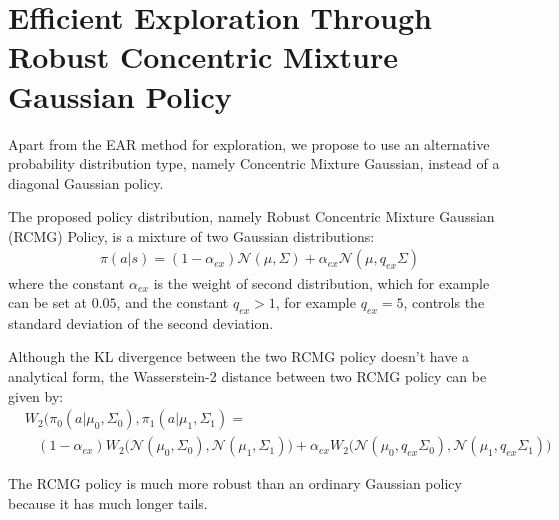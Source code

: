 \section{Efficient Exploration Through Robust Concentric Mixture Gaussian Policy}
Apart from the EAR method for exploration, we propose to use an alternative probability distribution type, namely Concentric Mixture Gaussian, instead of a diagonal Gaussian policy.

The proposed policy distribution, namely Robust Concentric Mixture Gaussian (RCMG) Policy, is a mixture of two Gaussian distributions:
\begin{align}
\pi (a|s) = (1-\alpha_{ex})\mathcal{N}(\mu,\Sigma) + \alpha_{ex} \mathcal{N}(\mu,q_{ex}\Sigma)
\end{align}
where the constant $\alpha_{ex}$ is the weight of second distribution, which for example can be set at $0.05$, and the constant $q_{ex}>1$, for example $q_{ex}=5$,  controls the standard deviation of the second deviation.

Although the KL divergence between the two RCMG policy doesn't have a analytical form, the Wasserstein-2 distance between two RCMG policy can be given by:
\begin{align}&W_2(\pi_{0}(a|\mu_0,\Sigma_0), \pi_{1}(a|\mu_1,\Sigma_1) =  \\ \nonumber
& \ \ \ \ (1-\alpha_{ex})
W_2\big(\mathcal{N}(\mu_0,\Sigma_0), \mathcal{N}(\mu_1,\Sigma_1)\big)
+ \alpha_{ex} W_2\big(\mathcal{N}(\mu_0,q_{ex}\Sigma_0), \mathcal{N}(\mu_1,q_{ex}\Sigma_1)\big)
\end{align}

The RCMG policy is much more robust than an ordinary Gaussian policy because it has much longer tails.

